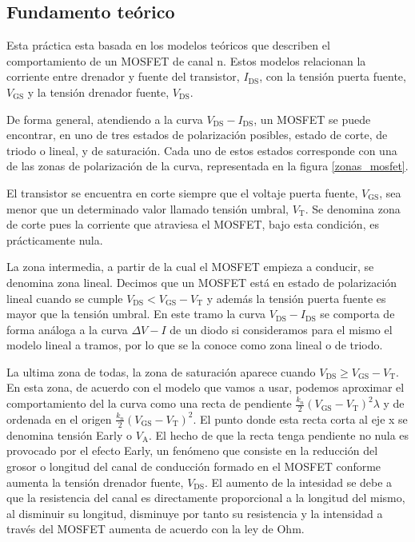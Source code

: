 \documentclass[11pt,a4paper]{article}
\begin{document}
	\subsection{Fundamento teórico}
    Esta pr\'actica esta basada en los modelos te\'oricos que describen el comportamiento de un MOSFET de canal n. Estos modelos relacionan la corriente entre drenador y fuente del transistor, $I_\mathrm{DS}$, con la tensi\'on puerta fuente, $V_\mathrm{GS}$ y la tensi\'on drenador fuente, $V_\mathrm{DS}$.

    De forma general, atendiendo a la curva $V_\mathrm{DS}-I_\mathrm{DS}$, un MOSFET se puede encontrar, en uno de tres estados de polarización posibles, estado de corte, de triodo o lineal, y de saturaci\'on. Cada uno de estos estados corresponde con una de las zonas de polarización de la curva, representada en la figura \ref{zonas_mosfet}.

		El transistor se encuentra en corte siempre que el voltaje puerta fuente, $V_\mathrm{GS}$, sea menor que un determinado valor llamado tensión umbral, $V_\mathrm{T}$. Se denomina zona de corte pues la corriente que atraviesa el MOSFET, bajo esta condición, es prácticamente nula.

		La zona intermedia, a partir de la cual el MOSFET empieza a conducir, se denomina zona lineal. Decimos que un MOSFET está en estado de polarización lineal cuando se cumple $V_\mathrm{DS}< V_\mathrm{GS}-V_\mathrm{T}$ y además la tensión puerta fuente es mayor que la tensión umbral. En este tramo la curva $V_\mathrm{DS}-I_\mathrm{DS}$ se comporta de forma análoga a la curva $\Delta V-I$ de un diodo si consideramos para el mismo el modelo lineal a tramos, por lo que se la conoce como zona lineal o de triodo.

		La ultima zona de todas, la zona de saturación aparece cuando $V_\mathrm{DS}\geq V_\mathrm{GS}-V_\mathrm{T}$. En esta zona, de acuerdo con el modelo que vamos a usar, podemos aproximar el comportamiento del la curva como una recta de pendiente $\frac{k_n}{2}\left(V_{\mathrm{GS}}-V_{\mathrm{T}}\right)^2\lambda$ y de ordenada en el origen $\frac{k_n}{2}\left(V_{\mathrm{GS}}-V_{\mathrm{T}}\right)^2$. El punto donde esta recta corta al eje x se denomina tensión Early o $V_\mathrm{A}$. El hecho de que la recta tenga pendiente no nula es provocado por el efecto Early, un fenómeno que consiste en la reducción del grosor o longitud del canal de conducción formado en el MOSFET conforme aumenta la tensión drenador fuente, $V_\mathrm{DS}$. El aumento de la intesidad se debe a que la resistencia del canal es directamente proporcional a la longitud del mismo, al disminuir su longitud, disminuye por tanto su resistencia y la intensidad a través del MOSFET aumenta de acuerdo con la ley de Ohm.
\end{document}
